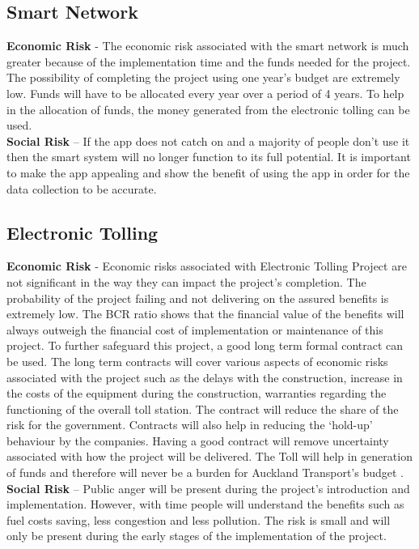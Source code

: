 \documentclass[twoside, a4paper, 11pt]{article}
\begin{document}
\subsection{Smart Network}
\textbf{Economic Risk} - The economic risk associated with the smart network is much greater because of the implementation time and the funds needed for the project. The possibility of completing the project using one year's budget are extremely low. Funds will have to be allocated every year over a period of 4 years. To help in the allocation of funds, the money generated from the electronic tolling can be used. 
\\
\textbf{Social Risk} –  If the app does not catch on and a majority of people don't use it then the smart system will no longer function to its full potential. It is important to make the app appealing and show the benefit of using the app in order for the data collection to be accurate.

\subsection{Electronic Tolling}
\textbf{Economic Risk} - Economic risks associated with Electronic Tolling Project are not significant in the way they can impact the project's completion. The probability of the project failing and not delivering on the assured benefits is extremely low. The BCR ratio shows that the financial value of the benefits will always outweigh the financial cost of implementation or maintenance of this project. To further safeguard this project, a good long term formal contract can be used. The long term contracts will cover various aspects of economic risks associated with the project such as the delays with the construction, increase in the costs of the equipment during the construction, warranties regarding the functioning of the overall toll station. The contract will reduce the share of the risk for the government. Contracts will also help in reducing the `hold-up' behaviour by the companies. Having a good contract will remove uncertainty associated with how the project will be delivered. The Toll will help in generation of funds and therefore will never be a burden for Auckland Transport's budget \citep{dailamietalND}.\\
\textbf{Social Risk} –  Public anger will be present during the project's introduction and implementation. However, with time people will understand the benefits such as fuel costs saving, less congestion and less pollution. The risk is small and will only be present during the early stages of the implementation of the project.
\newpage
\end{document}
